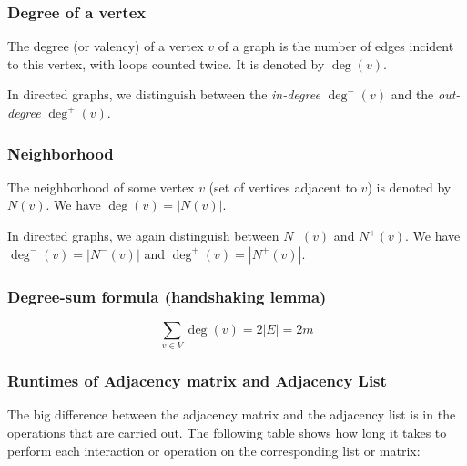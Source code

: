 \documentclass[a4paper]{article}
\begin{document}
\subsubsection{Degree of a vertex}
The degree (or valency) of a vertex $v$ of a graph is the number of edges incident to this vertex, with loops counted twice. It is denoted by $\deg(v)$.

In directed graphs, we distinguish between the \textit{in-degree} $\deg^-(v)$ and the \textit{out-degree} $\deg^+(v)$.

\subsubsection{Neighborhood}
The neighborhood of some vertex $v$ (set of vertices adjacent to $v$) is denoted by $N(v)$. We have $\deg\left(v\right)=\left\lvert N\left(v\right) \right\rvert$.

In directed graphs, we again distinguish between $N^-\left(v\right)$ and $N^+\left(v\right)$. We have $\deg^-(v)=|N^-(v)|$ and $\deg^+(v)=|N^+(v)|$.

\subsubsection{Degree-sum formula (handshaking lemma)}
$$\sum_{v\in V} \deg(v)=2|E|=2m$$

\subsubsection{Runtimes of Adjacency matrix and Adjacency List}
The big difference between the adjacency matrix and the adjacency list is in the operations that are carried out. The following table shows how long it takes to perform each interaction or operation on the corresponding list or matrix:
\end{document}
